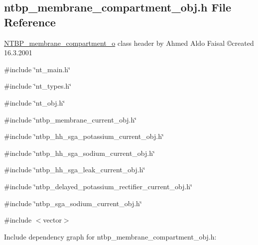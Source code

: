 \subsection{ntbp\_\-membrane\_\-compartment\_\-obj.h File Reference}
\label{ntbp__membrane__compartment__obj_8h}



\begin{DoxyItemize}
\item \hyperlink{class_n_t_b_p__membrane__compartment__o}{NTBP\_\-membrane\_\-compartment\_\-o} class header by Ahmed Aldo Faisal \copyright created 16.3.2001 
\end{DoxyItemize} 


{\ttfamily \#include \char`\"{}nt\_\-main.h\char`\"{}}\par
{\ttfamily \#include \char`\"{}nt\_\-types.h\char`\"{}}\par
{\ttfamily \#include \char`\"{}nt\_\-obj.h\char`\"{}}\par
{\ttfamily \#include \char`\"{}ntbp\_\-membrane\_\-current\_\-obj.h\char`\"{}}\par
{\ttfamily \#include \char`\"{}ntbp\_\-hh\_\-sga\_\-potassium\_\-current\_\-obj.h\char`\"{}}\par
{\ttfamily \#include \char`\"{}ntbp\_\-hh\_\-sga\_\-sodium\_\-current\_\-obj.h\char`\"{}}\par
{\ttfamily \#include \char`\"{}ntbp\_\-hh\_\-sga\_\-leak\_\-current\_\-obj.h\char`\"{}}\par
{\ttfamily \#include \char`\"{}ntbp\_\-delayed\_\-potassium\_\-rectifier\_\-current\_\-obj.h\char`\"{}}\par
{\ttfamily \#include \char`\"{}ntbp\_\-sga\_\-sodium\_\-current\_\-obj.h\char`\"{}}\par
{\ttfamily \#include $<$vector$>$}\par
Include dependency graph for ntbp\_\-membrane\_\-compartment\_\-obj.h:
\nopagebreak
